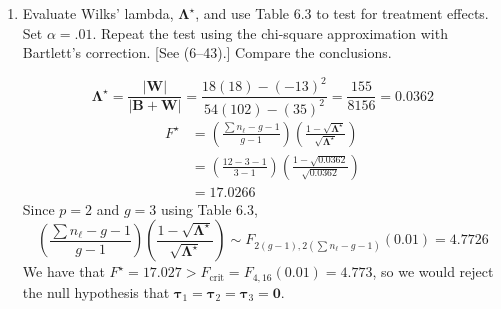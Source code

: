 \begin{enumerate}[label= (\alph*)]
    \item Evaluate Wilks' lambda, $\bm{\Lambda}^{\star}$, and use Table 6.3 to test for treatment effects.
    Set $\alpha = .01$. Repeat the test using the chi-square approximation with Bartlett's correction.
    [See (6--43).] Compare the conclusions.

    \[
        \bm{\Lambda}^{\star}
        =
        \frac{\left|\textbf{W}\right|}{\left|\textbf{B} + \textbf{W}\right|}
        =
        \frac{18(18) - {(-13)}^{2}}{54(102) - {(35)}^{2}}
        =
        \frac{155}{8156}
        =
        0.0362
    \]
    \begin{align*}
        F^{\star}
        & =
        \left(
            \frac{\sum{n_{\ell} - g - 1}}{g - 1}
        \right)
        \left(
            \frac{1 - \sqrt{\bm{\Lambda}^{\star}}}{\sqrt{\bm{\Lambda}^{\star}}}
        \right) \\
        & =
        \left(
            \frac{12 - 3 - 1}{3 - 1}
        \right)
        \left(
            \frac{1 - \sqrt{0.0362}}{\sqrt{0.0362}}
        \right) \\
        & =
        17.0266
    \end{align*}
    Since $p = 2$ and $g = 3$ using Table 6.3,
    \[
        \left(
            \frac{\sum{n_{\ell} - g - 1}}{g - 1}
        \right)
        \left(
            \frac{1 - \sqrt{\bm{\Lambda}^{\star}}}{\sqrt{\bm{\Lambda}^{\star}}}
        \right)
        \sim
        F_{2(g-1), 2(\sum{n_{\ell} - g - 1})}(0.01)
        =
        4.7726
    \]
    We have that $F^{\star} = 17.027 > F_{\text{crit}} = F_{4,16}(0.01) = 4.773$, so we would reject the null hypothesis that $\bm{\tau}_{1} = \bm{\tau}_{2} = \bm{\tau}_{3} = \textbf{0}$.
\end{enumerate}